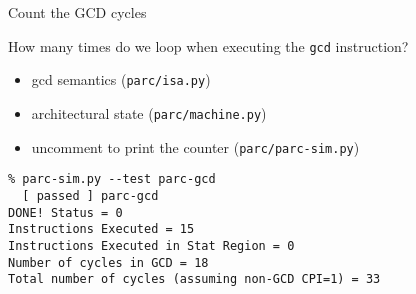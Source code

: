 
\begin{task}
\begin{frame}[fragile]{Count the GCD cycles}

{}How many times do we loop when executing the \texttt{gcd} instruction?

\begin{itemize}
  \item gcd semantics (\texttt{parc/isa.py})
  \item architectural state (\texttt{parc/machine.py})
  \item uncomment to print the counter (\texttt{parc/parc-sim.py})
\end{itemize}

\begin{Verbatim}[commandchars=\\\{\}]
% cd \midtilde/pydgin/parc/asm_tests/build
% parc-sim.py --test parc-gcd
  [ passed ] parc-gcd
DONE! Status = 0
Instructions Executed = 15
Instructions Executed in Stat Region = 0
Number of cycles in GCD = 18
Total number of cycles (assuming non-GCD CPI=1) = 33
\end{Verbatim}

\end{frame}
\end{task}



